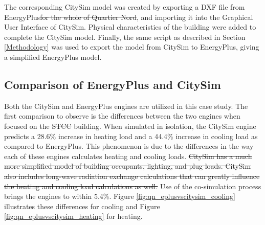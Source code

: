 \documentclass{tBPS2e}
\theoremstyle{plain}
\theoremstyle{definition}
\theoremstyle{remark}
\newcommand{\noteDT}[1]{\footnote{\textcolor{green}{#1}}}
\providecommand{\DIFadd}[1]{{\protect\color{blue}\uwave{#1}}} %
\providecommand{\DIFdel}[1]{{\protect\color{red}\sout{#1}}}                      %
\providecommand{\DIFaddbegin}{} %
\providecommand{\DIFaddend}{} %
\providecommand{\DIFdelbegin}{} %
\providecommand{\DIFdelend}{} %
\begin{document}
The corresponding CitySim model was created by exporting a DXF file from
EnergyPlus\DIFdelbegin \DIFdel{for the whole of Quartier Nord}\DIFdelend , and importing it into the Graphical User Interface of CitySim.
Physical characteristics of the building were added to complete the CitySim
model. Finally, the same script as described in Section \ref{Methodology} was
used to export the model from CitySim to EnergyPlus, giving a simplified
EnergyPlus model.\\


\DIFaddbegin 


\DIFaddend \subsection{Comparison of EnergyPlus and CitySim}

Both the CitySim and EnergyPlus engines are utilized in this case study. The
first comparison to observe is the differences between the two engines when
focused on the \DIFdelbegin \DIFdel{STCC }\DIFdelend \DIFaddbegin \DIFadd{Quartier Nord }\DIFaddend building. When simulated in isolation, the
CitySim engine predicts a 28.6\% increase in heating load and a 44.4\%
increase in cooling load as compared to EnergyPlus. This phenomenon is due to
the differences in the way each of these engines calculates heating and
cooling loads. \DIFdelbegin \DIFdel{CitySim has a much more simplified model of building occupants,
lighting, and plug loads. CitySim also includes long-wave radiation exchange calculations
that can greatly influence the heating and cooling load calculations as well.
 }\DIFdelend Use of the co-simulation process brings the engines to within
5.4\%. Figure \ref{fig:qn_eplusvscitysim_cooling} illustrates these
differences for cooling and Figure \ref{fig:qn_eplusvscitysim_heating} for
heating.
\end{document}
